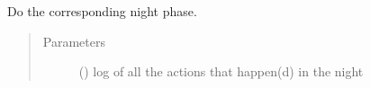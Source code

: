 \documentclass[letterpaper,10pt,english]{sphinxmanual}
\begin{document}
\begin{fulllineitems}
\begin{fulllineitems}
Do the corresponding night phase.
\begin{quote}\begin{description}
\item[{Parameters}] \leavevmode
{} ({\hyperref[\detokenize{chatwolf:chatwolf.nightactions.Nightactions}]{}}) \textendash{} log of all the actions that happen(d) in the night

\end{description}\end{quote}

\end{fulllineitems}


\end{fulllineitems}
\end{document}
